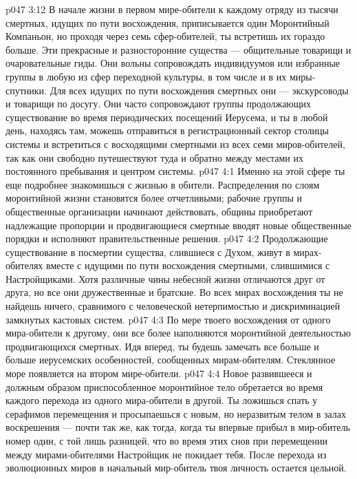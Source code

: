 \vs p047 3:12 В начале жизни в первом мире\hyp{}обители к каждому отряду из тысячи смертных, идущих по пути восхождения, приписывается один Моронтийный Компаньон, но проходя через семь сфер\hyp{}обителей, ты встретишь их гораздо больше. Эти прекрасные и разносторонние существа --- общительные товарищи и очаровательные гиды. Они вольны сопровождать индивидуумов или избранные группы в любую из сфер переходной культуры, в том числе и в их миры\hyp{}спутники. Для всех идущих по пути восхождения смертных они --- экскурсоводы и товарищи по досугу. Они часто сопровождают группы продолжающих существование во время периодических посещений Иерусема, и ты в любой день, находясь там, можешь отправиться в регистрационный сектор столицы системы и встретиться с восходящими смертными из всех семи миров\hyp{}обителей, так как они свободно путешествуют туда и обратно между местами их постоянного пребывания и центром системы.
\vs p047 4:1 Именно на этой сфере ты еще подробнее знакомишься с жизнью в обители. Распределения по слоям моронтийной жизни становятся более отчетливыми; рабочие группы и общественные организации начинают действовать, общины приобретают надлежащие пропорции и продвигающиеся смертные вводят новые общественные порядки и исполняют правительственные решения.
\vs p047 4:2 Продолжающие существование в посмертии существа, слившиеся с Духом, живут в мирах\hyp{}обителях вместе с идущими по пути восхождения смертными, слившимися с Настройщиками. Хотя различные чины небесной жизни отличаются друг от друга, но все они дружественные и братские. Во всех мирах восхождения ты не найдешь ничего, сравнимого с человеческой нетерпимостью и дискриминацией замкнутых кастовых систем.
\vs p047 4:3 По мере твоего восхождения от одного мира\hyp{}обители к другому, они все более наполняются моронтийной деятельностью продвигающихся смертных. Идя вперед, ты будешь замечать все больше и больше иерусемских особенностей, сообщенных мирам\hyp{}обителям. Стеклянное море появляется на втором мире\hyp{}обители.
\vs p047 4:4 Новое развившееся и должным образом приспособленное моронтийное тело обретается во время каждого перехода из одного мира\hyp{}обители в другой. Ты ложишься спать у серафимов перемещения и просыпаешься с новым, но неразвитым телом в залах воскрешения --- почти так же, как тогда, когда ты впервые прибыл в мир\hyp{}обитель номер один, с той лишь разницей, что во время этих снов при перемещении между мирами\hyp{}обителями Настройщик не покидает тебя. После перехода из эволюционных миров в начальный мир\hyp{}обитель твоя личность остается цельной.
